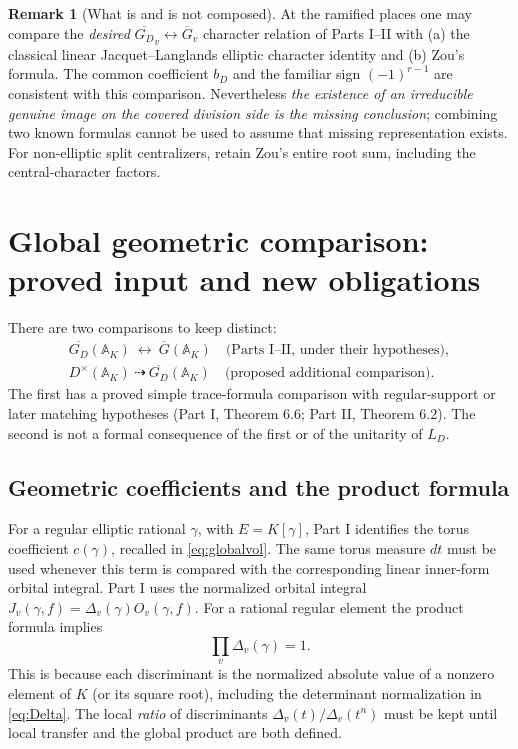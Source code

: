 \documentclass[11pt]{article}
\newcommand{\A}{\mathbb A}
\newcommand{\Gb}{\overline G}
\newcommand{\GDb}{\overline{G_D}}
\theoremstyle{plain}
\theoremstyle{definition}
\newtheorem{remark}[theorem]{Remark}
\begin{document}
\begin{remark}[What is and is not composed]
At the ramified places one may compare the \emph{desired}
$\GDb_v\leftrightarrow\Gb_v$ character relation of Parts I--II
with (a) the classical linear Jacquet--Langlands elliptic
character identity and (b) Zou's formula.  The common coefficient
$b_D$ and the familiar sign $(-1)^{r-1}$ are consistent with
this comparison.  Nevertheless \emph{the existence of an
irreducible genuine image on the covered division side is the
missing conclusion}; combining two known formulas cannot be
used to assume that missing representation exists.
For non-elliptic split centralizers, retain Zou's entire
root sum, including the central-character factors.
\end{remark}

\section{Global geometric comparison: proved input and new obligations}\label{sec:geometric}
There are two comparisons to keep distinct:
\begin{equation}\label{eq:twocomparisons}
 \begin{gathered}
 \GDb(\A_K)\ \longleftrightarrow\ \Gb(\A_K)
 \quad\text{(Parts I--II, under their hypotheses)},\\[3pt]
 D^\times(\A_K)\ \dashrightarrow\ \GDb(\A_K)
 \quad\text{(proposed additional comparison)}.
 \end{gathered}
\end{equation}
The first has a proved simple trace-formula comparison with
regular-support or later matching hypotheses (Part I, Theorem 6.6;
Part II, Theorem 6.2).
The second is not a formal consequence of the first or of the
unitarity of $L_D$.

\subsection{Geometric coefficients and the product formula}
For a regular elliptic rational $\gamma$, with $E=K[\gamma]$,
Part I identifies the torus coefficient $c(\gamma)$, recalled in
\eqref{eq:globalvol}. The same torus measure $dt$ must be used
whenever this term is compared with the corresponding linear
inner-form orbital integral.
Part I uses the normalized orbital integral
$J_v(\gamma,f)=\Delta_v(\gamma)O_v(\gamma,f)$.
For a rational regular element the product formula implies
\begin{equation}\label{eq:discprod}
 \prod_v\Delta_v(\gamma)=1.
\end{equation}
This is because each discriminant is the normalized absolute
value of a nonzero element of $K$ (or its square root), including
the determinant normalization in \eqref{eq:Delta}.
The local \emph{ratio} of discriminants
$\Delta_v(t)/\Delta_v(t^n)$ must be kept until local transfer
and the global product are both defined.
\end{document}
